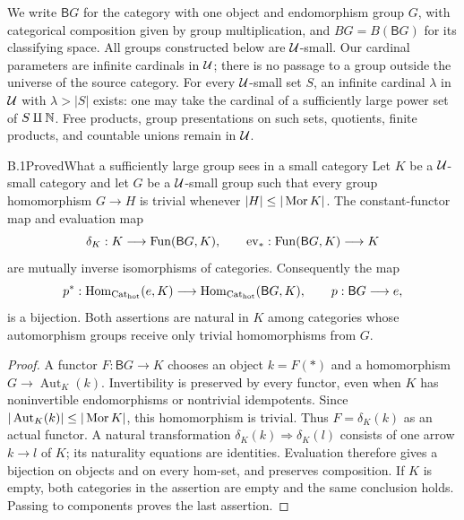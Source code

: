 
We write $\mathsf B G$ for the category with one object and endomorphism
group $G$, with categorical composition given by group multiplication, and
$BG=B(\mathsf B G)$ for its classifying space.  All groups constructed below
are $\mathcal U$-small.  Our cardinal parameters are infinite cardinals in $\mathcal U$;
there is no passage to a group outside the universe of the source category.
For every $\mathcal U$-small set $S$, an infinite cardinal $\lambda$ in $\mathcal U$ with
$\lambda>|S|$ exists: one may take the cardinal of a sufficiently large
power set of $S\amalg\mathbb N$.  Free products, group presentations on such sets,
quotients, finite products, and countable unions remain in $\mathcal U$.

\begin{claim}{B.1}{Proved}{What a sufficiently large group sees in a small category}
Let $K$ be a $\mathcal U$-small category and let $G$ be a $\mathcal U$-small group such that
every group homomorphism $G\longrightarrow H$ is trivial whenever
$|H|\leq |\operatorname{Mor} K|$.  The constant-functor map and evaluation map
\[
 \delta_K:K\longrightarrow\operatorname{Fun}(\mathsf B G,K),\qquad
 \operatorname{ev}_*: \operatorname{Fun}(\mathsf B G,K)\longrightarrow K
\]
are mutually inverse isomorphisms of categories.  Consequently the map
\[
 p^*:\operatorname{Hom}_{{\mathrm{Cat}_{\mathrm{hot}}}}(e,K)\longrightarrow
       \operatorname{Hom}_{{\mathrm{Cat}_{\mathrm{hot}}}}(\mathsf B G,K),\qquad p:\mathsf B G\longrightarrow e,
\]
is a bijection.  Both assertions are natural in $K$ among categories
whose automorphism groups receive only trivial homomorphisms from $G$.
\end{claim}
\begin{proof}
A functor $F:\mathsf B G\to K$ chooses an object $k=F(*)$ and a
homomorphism $G\to\operatorname{Aut}_K(k)$.  Invertibility is preserved by
every functor, even when $K$ has noninvertible endomorphisms or nontrivial
idempotents.  Since
$|\operatorname{Aut}_K(k)|\leq |\operatorname{Mor} K|$, this homomorphism is trivial.
Thus $F=\delta_K(k)$ as an actual functor.  A natural transformation
$\delta_K(k)\Rightarrow\delta_K(l)$ consists of one arrow $k\to l$ of
$K$; its naturality equations are identities.  Evaluation therefore gives
a bijection on objects and on every hom-set, and preserves composition.
If $K$ is empty, both categories in the assertion are empty and the same
conclusion holds.  Passing to components proves the last assertion.
\end{proof}

